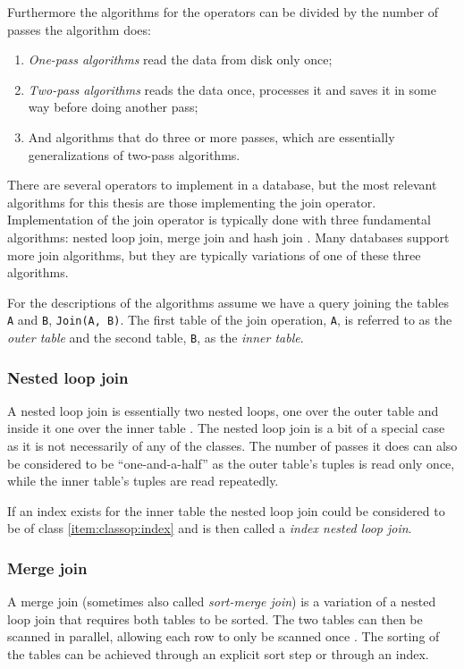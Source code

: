 Furthermore the algorithms for the operators can be divided by the number of passes the algorithm does:
\begin{enumerate}
    \item \textit{One-pass algorithms} read the data from disk only once;
    \item \textit{Two-pass algorithms} reads the data once, processes it and saves it in some way before doing another pass;
    \item And algorithms that do three or more passes, which are essentially generalizations of two-pass algorithms.
\end{enumerate}

There are several operators to implement in a database, but the most relevant algorithms for this thesis are those implementing the join operator. Implementation of the join operator is typically done with three fundamental algorithms: nested loop join, merge join and hash join \cite{postgresql_pd9p}. Many databases support more join algorithms, but they are typically variations of one of these three algorithms.

For the descriptions of the algorithms assume we have a query joining the tables \texttt{A} and \texttt{B}, \texttt{Join(A, B)}. The first table of the join operation, \texttt{A}, is referred to as the \textit{outer table} and the second table, \texttt{B}, as the \textit{inner table}.

\subsubsection{Nested loop join} \label{sec:nestedloopjoin}
A nested loop join is essentially two nested loops, one over the outer table and inside it one over the inner table \cite[p. 718-722]{garcia-molina_2002_database_dstcb}. The nested loop join is a bit of a special case as it is not necessarily of any of the classes. The number of passes it does can also be considered to be ``one-and-a-half'' as the outer table's tuples is read only once, while the inner table's tuples are read repeatedly.

If an index exists for the inner table the nested loop join could be considered to be of class \ref{item:classop:index} and is then called a \textit{index nested loop join}.

\subsubsection{Merge join}
A merge join (sometimes also called \textit{sort-merge join}) is a variation of a nested loop join that requires both tables to be sorted. The two tables can then be scanned in parallel, allowing each row to only be scanned once \cite[p. 723-730]{garcia-molina_2002_database_dstcb}. The sorting of the tables can be achieved through an explicit sort step or through an index.

